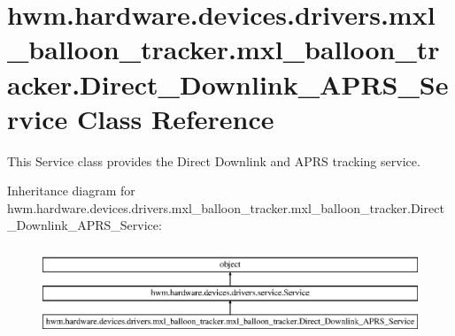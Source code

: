 \hypertarget{classhwm_1_1hardware_1_1devices_1_1drivers_1_1mxl__balloon__tracker_1_1mxl__balloon__tracker_1_1e3a9bc8b0b4bc235d39c93a5b84975bc}{\section{hwm.\-hardware.\-devices.\-drivers.\-mxl\-\_\-balloon\-\_\-tracker.\-mxl\-\_\-balloon\-\_\-tracker.\-Direct\-\_\-\-Downlink\-\_\-\-A\-P\-R\-S\-\_\-\-Service Class Reference}
\label{classhwm_1_1hardware_1_1devices_1_1drivers_1_1mxl__balloon__tracker_1_1mxl__balloon__tracker_1_1e3a9bc8b0b4bc235d39c93a5b84975bc}
}


This Service class provides the Direct Downlink and A\-P\-R\-S tracking service.  


Inheritance diagram for hwm.\-hardware.\-devices.\-drivers.\-mxl\-\_\-balloon\-\_\-tracker.\-mxl\-\_\-balloon\-\_\-tracker.\-Direct\-\_\-\-Downlink\-\_\-\-A\-P\-R\-S\-\_\-\-Service\-:\begin{figure}[H]
\begin{center}
\leavevmode
\includegraphics[height=2.727273cm]{classhwm_1_1hardware_1_1devices_1_1drivers_1_1mxl__balloon__tracker_1_1mxl__balloon__tracker_1_1e3a9bc8b0b4bc235d39c93a5b84975bc}
\end{center}
\end{figure}

